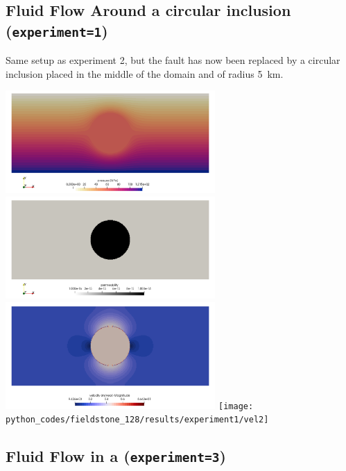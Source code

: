\subsection*{Fluid Flow Around a circular inclusion ({\tt experiment=1})}

Same setup as experiment 2, but the fault has now been replaced by a circular inclusion 
placed in the middle of the domain and of radius 5~\si{\km}.

\begin{center}
\includegraphics[width=8cm]{python_codes/fieldstone_128/results/experiment1/press}
\includegraphics[width=8cm]{python_codes/fieldstone_128/results/experiment1/K}\\
\includegraphics[width=8cm]{python_codes/fieldstone_128/results/experiment1/vel}
\texttt{[image: python\_codes/fieldstone\_128/results/experiment1/vel2]}\\
\end{center}


\subsection*{Fluid Flow in a  ({\tt experiment=3})}

